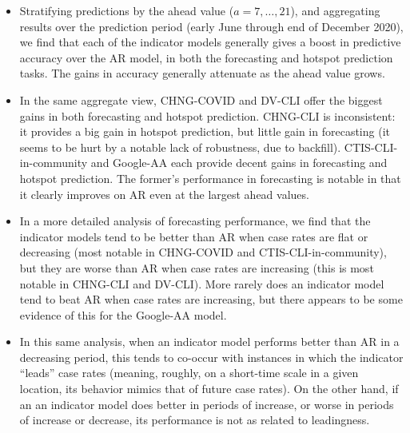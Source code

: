 \documentclass[9pt,twocolumn,twoside,lineno]{pnas-new}
\begin{document}
\begin{itemize}
\item Stratifying predictions by the ahead value ($a=7,\ldots,21$), and
  aggregating results over the prediction period (early June through end of
  December 2020), we find that each of the indicator models generally gives a
  boost in predictive accuracy over the AR model, in both the forecasting and
  hotspot prediction tasks.  The gains in accuracy generally attenuate as the
  ahead value grows. 

\item In the same aggregate view, CHNG-COVID and DV-CLI offer the biggest 
  gains in both forecasting and hotspot prediction.  CHNG-CLI is
  inconsistent: it provides a big gain in hotspot prediction, but little gain 
  in forecasting (it seems to be hurt by a notable lack of robustness, due
  to backfill).  CTIS-CLI-in-community and Google-AA each provide decent 
  gains in forecasting and hotspot prediction.  The former's performance in 
  forecasting is notable in that it clearly improves on AR even at the largest
  ahead values.   

\item In a more detailed analysis of forecasting performance, we find that the
  indicator models tend to be better than AR when case rates are flat or
  decreasing (most notable in CHNG-COVID and CTIS-CLI-in-community), but they
  are worse than AR when case rates are increasing (this is most notable in
  CHNG-CLI and DV-CLI). More rarely does an indicator model tend to beat AR when
  case rates are increasing, but there appears to be some evidence of this for
  the Google-AA model. 

\item In this same analysis, when an indicator model performs better than AR in
  a decreasing period, this tends to co-occur with instances in which the
  indicator ``leads'' case rates (meaning, roughly, on a short-time scale in a
  given location, its behavior mimics that of future case rates).  On
  the other hand, if an an indicator model does better in periods of
  increase, or worse in periods of increase or decrease, its performance is
  not as related to leadingness.   
\end{itemize}
\end{document}
